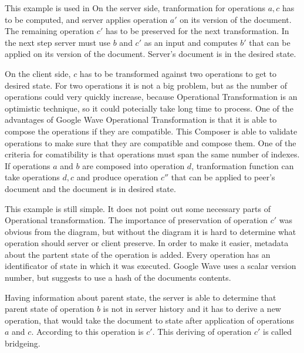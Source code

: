 \documentclass[12pt,oneside]{fithesis2}
\begin{document}
This example is used in \cite{Spiewak} On the server side, tranformation for operations \(a,c\) has to be computed, and server applies operation \(a'\) on its version of the document. The remaining operation \(c'\) has to be preserved for the next transformation. In the next step server must use \(b\) and \(c'\) as an input and computes \(b'\) that can be applied on its version of the document. Server's document is in the desired state. 
\par On the client side, \(c\) has to be transformed against two operations to get to desired state. For two operations it is not a big problem, but as the number of operations could very quickly increase, because Operational Transformation is an optimistic technique, so it could potecially take long time to process. One of the advantages of Google Wave Operational Transformation is that it is able to compose the operations if they are compatible. This Composer is able to validate operations to make sure that they are compatible and compose them. One of the criteria for comatibility is that operations must span the same number of indexes.  If operations \(a\) and \(b\) are composed into operation \(d\), tranformation function can take operations \(d,c\) and produce operation \(c''\) that can be applied to peer's document and the document is in desired state. 
\par This example is still simple. It does not point out some necessary parts of Operational transformation. The importance of preservation of operation \(c'\) was obvious from the diagram, but without the diagram it is hard to determine what operation should server or client preserve. In order to make it easier, metadata about the partent state of the operation is added. Every operation has an identificator of state in which it was executed. Google Wave uses a scalar version number, but \cite{Spiewak} suggests to use a hash of the documents contents. 
\par Having information about parent state, the server is able to determine that parent state of operation \(b\) is not in server history and it has to derive a new operation, that would take the document to state after application of operations \(a\) and \(c\). According to \cite{Spiewak} this operation is \(c'\). This deriving of operation \(c'\) is called bridgeing.
\end{document}
